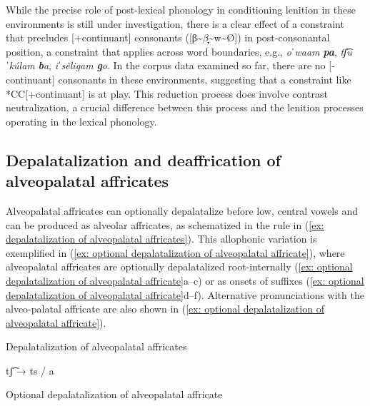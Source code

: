 While the precise role of post-lexical phonology in conditioning lenition in these environments is still under investigation, there is a clear effect of a constraint that precludes [+continuant] consonants ([β{\textasciitilde}$β̞̞${\textasciitilde}w{\textasciitilde}Ø]) in post-consonantal position, a constraint that applies across word boundaries, e.g., \textit{oˈwaam} \textbf{\textit{pa}}, \textit{tʃ͡uˈkú\-lam} \textbf{\textit{b}}\textit{a}, \textit{iˈsêligam} \textbf{\textit{g}}\textit{o}. In the corpus data examined so far, there are no [-continuant] consonants in these environments, suggesting that a constraint like *CC[+con\-tin\-u\-ant] is at play. This reduction process does involve contrast neutralization, a crucial difference between this process and the lenition processes operating in the lexical phonology.

\subsection{Depalatalization and deaffrication of alveopalatal affricates}
\label{subsec: depalatalization and deaffrication of alveopalatal affricates}

Alveopalatal affricates can optionally depalatalize before low, central vowels and can be produced as alveolar affricates, as schematized in the rule in (\ref{ex: depalatalization of alveopalatal affricates}). This allophonic variation is exemplified in (\ref{ex: optional depalatalization of alveopalatal affricate}), where alveopalatal affricates are optionally depalatalized root-internally (\ref{ex: optional depalatalization of alveopalatal affricate}a--c) or as onsets of suffixes (\ref{ex: optional depalatalization of alveopalatal affricate}d--f). Alternative pronunciations with the alveo-palatal affricate are also shown in (\ref{ex: optional depalatalization of alveopalatal affricate}).

\ea\label{ex: depalatalization of alveopalatal affricates}
{Depalatalization of alveopalatal affricates}

tʃ͡  	→	  ts / {\longrule} a

\z

\ea\label{ex: optional depalatalization of alveopalatal affricate}
{Optional depalatalization of alveopalatal affricate}

